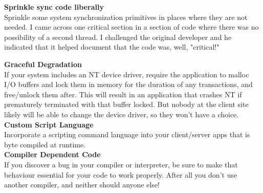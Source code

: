 \documentclass[11pt,twoside,a4paper]{article}
\begin{document}
\textbf{Sprinkle sync code liberally}~\\
Sprinkle some system synchronization primitives in places where they are not needed. I came across one critical section in a section of code where there was no possibility of a second thread. I challenged the original developer and he indicated that it helped document that the code was, well, "critical!" ~\\

\clearpage

\textbf{Graceful Degradation}~\\
If your system includes an NT device driver, require the application to malloc I/O buffers and lock them in memory for the duration of any transactions, and free/unlock them after. This will result in an application that crashes NT if prematurely terminated with that buffer locked. But nobody at the client site likely will be able to change the device driver, so they won't have a choice. ~\\

\textbf{Custom Script Language}~\\
Incorporate a scripting command language into your client/server apps that is byte compiled at runtime. ~\\

\textbf{Compiler Dependent Code}~\\
If you discover a bug in your compiler or interpreter, be sure to make that behaviour essential for your code to work properly. After all you don't use another compiler, and neither should anyone else! ~\\
\end{document}
